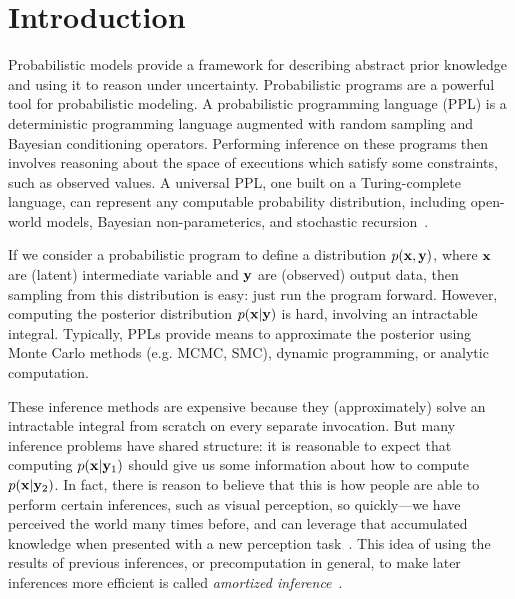 \section{Introduction}
\label{sec:introduction}


Probabilistic models provide a framework for describing abstract prior knowledge and using it to reason under uncertainty.
Probabilistic programs are a powerful tool for probabilistic modeling. A probabilistic programming language (PPL) is a deterministic programming language augmented with random sampling and Bayesian conditioning operators. 
Performing inference on these programs then involves reasoning about the space of executions which satisfy some constraints, such as observed values. 
A universal PPL, one built on a Turing-complete language, can represent any computable probability distribution, including open-world models, Bayesian non-parameterics, and stochastic recursion~\cite{Church,Venture,Anglican}.


If we consider a probabilistic program to define a distribution $p(\mathbf{x}, \mathbf{y})$, where $\mathbf{x}$ are (latent) intermediate variable and $\mathbf{y}$ are (observed) output data, then sampling from this distribution is easy: just run the program forward. However, computing the posterior distribution $p(\mathbf{x} | \mathbf{y})$ is hard, involving an intractable integral. Typically, PPLs provide means to approximate the posterior using Monte Carlo methods (e.g. MCMC, SMC), dynamic programming, or analytic computation.


These inference methods are expensive because they (approximately) solve an intractable integral from scratch on every separate invocation.
But many inference problems have shared structure: it is reasonable to expect that computing $p(\mathbf{x} | \mathbf{y}_1)$ should give us some information about how to compute $p(\mathbf{x} | \mathbf{y}_2)$.
In fact, there is reason to believe that this is how people are able to perform certain inferences, such as visual perception, so quickly---we have perceived the world many times before, and can leverage that accumulated knowledge when presented with a new perception task~\cite{AmortizedInference}.
This idea of using the results of previous inferences, or precomputation in general, to make later inferences more efficient is called \emph{amortized inference}~\cite{AmortizedInference,StochasticInverses}.

